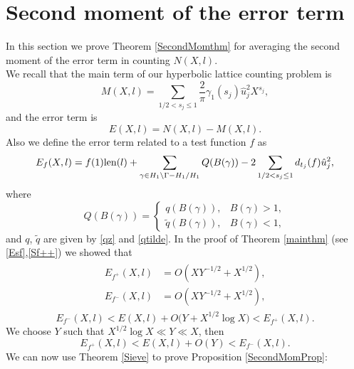 \documentclass[a4paper,11pt]{amsart}
\theoremstyle{definition}
\begin{document}
\section{Second moment of the error term}\label{meansquare}
In this section we prove Theorem \ref{SecondMomthm} for averaging the second moment of the error term in counting $N(X,l)$.\\
We recall that the main term of our hyperbolic lattice counting problem is
$$M(X,l)= \sum_{1/2< s_j \le 1} \frac{2}{\pi}\gamma_1(s_j)\hat{u}_j^2X^{s_j}, $$ and the error term is 
$$ E(X,l)=N(X,l)-M(X,l).$$
Also we define the error term related to a test function $f$ as
$$E_f(X,l)=f(1)\hbox{len}(l)+\sum_{\gamma \in H_1\backslash \Gamma-H_1 / H_1}Q(B(\gamma))-2\sum_{1/2 < s_j \le 1 }d_{t_j}(f)\hat{u}_j^2,$$
where
\[ Q(B(\gamma))= 
\begin{cases}
q(B(\gamma)), & B(\gamma)>1, \\
\widetilde{q}(B(\gamma)), & B(\gamma)<1,
\end{cases}
\] 
and $q$, $\widetilde{q}$ are given by \eqref{qz} and \eqref{qtilde}.
In the proof of Theorem \ref{mainthm} (see \eqref{Esf},\eqref{Sf++}) we showed that 
\begin{align}
    \begin{split} \label{E_f}
        E_{f^{+}}(X,l) &=O(XY^{-1/2}+X^{1/2}), \\
        E_{f^{-}}(X,l) &=O(XY^{-1/2}+X^{1/2}) , 
    \end{split}
\end{align}
$$E_{f^{-}}(X,l) <E(X,l)+O\Big(Y+X^{1/2}\log X\Big)<E_{f^{+}}(X,l).$$
We choose $Y$ such that $X^{1/2}\log X\ll Y \ll X$, then 
$$ E_{f^{+}}(X,l)<E(X,l)+O(Y)<E_{f^{-}}(X,l).$$
We can now use Theorem \ref{Sieve} to prove Proposition \ref{SecondMomProp}:
\end{document}
